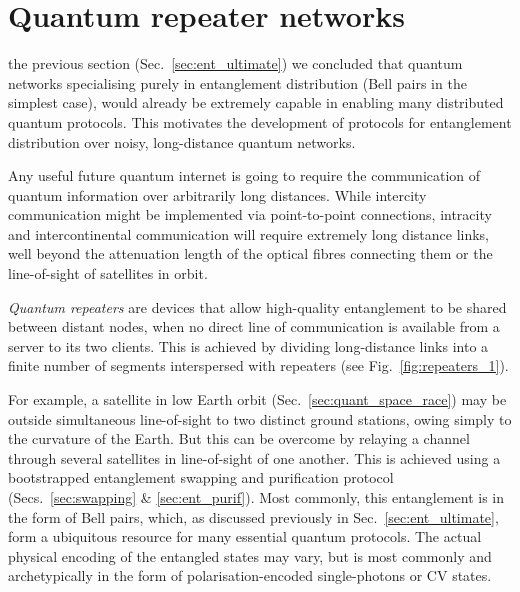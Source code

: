 %
%

\section{Quantum repeater networks} \label{sec:rep_net} 

 the previous section (Sec.~\ref{sec:ent_ultimate}) we concluded that quantum networks specialising purely in entanglement distribution (Bell pairs in the simplest case), would already be extremely capable in enabling many distributed quantum protocols. This motivates the development of protocols for entanglement distribution over noisy, long-distance quantum networks.

Any useful future quantum internet is going to require the communication of quantum information over arbitrarily long distances. While intercity communication might be implemented via point-to-point connections, intracity and intercontinental communication will require extremely long distance links, well beyond the attenuation length of the optical fibres connecting them or the line-of-sight of satellites in orbit.

\textit{Quantum repeaters} \cite{bib:Gisin2007, bib:sangouard11, bib:WJM2015} are devices that allow high-quality entanglement to be shared between distant nodes, when no direct line of communication is available from a server to its two clients. This is achieved by dividing long-distance links into a finite number of segments interspersed with repeaters (see Fig.~\ref{fig:repeaters_1}).

 For example, a satellite in low Earth orbit (Sec.~\ref{sec:quant_space_race}) may be outside simultaneous line-of-sight to two distinct ground stations, owing simply to the curvature of the Earth. But this can be overcome by relaying a channel through several satellites in line-of-sight of one another. This is achieved using a bootstrapped entanglement swapping and purification protocol (Secs.~\ref{sec:swapping} \& \ref{sec:ent_purif}). Most commonly, this entanglement is in the form of Bell pairs, which, as discussed previously in Sec.~\ref{sec:ent_ultimate}, form a ubiquitous resource for many essential quantum protocols. The actual physical encoding of the entangled states may vary, but is most commonly and archetypically in the form of polarisation-encoded single-photons or CV states.
 
